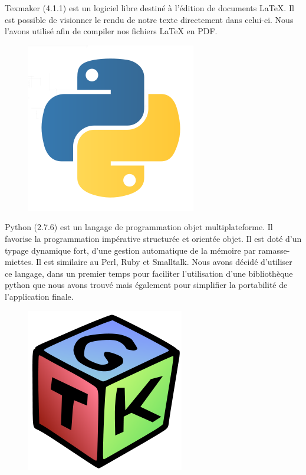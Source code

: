 \documentclass[16pts]{report}
\begin{document}
Texmaker (4.1.1) est un logiciel libre destiné à l'édition de documents LaTeX.
Il est possible de visionner le rendu de notre texte directement dans celui-ci.
Nous l'avons utilisé afin de compiler nos fichiers LaTeX en PDF.\\

\begin{figure}[H]
    \includegraphics[scale=0.2]{illustrations/python.png}
    \centering
\end{figure}

Python (2.7.6) est un langage de programmation objet multiplateforme.  Il
favorise la programmation impérative structurée et orientée objet. Il est doté
d'un typage dynamique fort, d'une gestion automatique de la mémoire par
ramasse-miettes. Il est similaire au Perl, Ruby et Smalltalk.  Nous avons
décidé d'utiliser ce langage, dans un premier temps pour faciliter
l'utilisation d'une bibliothèque python que nous avons trouvé mais également
pour simplifier la portabilité de l'application finale.\\

\begin{figure}[H]
    \includegraphics[scale=0.2]{illustrations/gtk.png}
    \centering
\end{figure}
\end{document}
